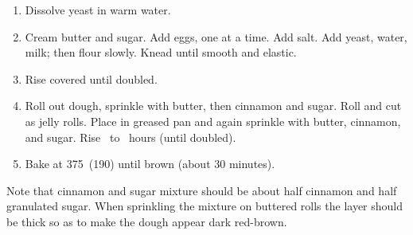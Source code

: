 
\begin{ingredients}
\end{ingredients}


\begin{recipe}
  \begin{enumerate}
  \item Dissolve yeast in warm water.

  \item Cream butter and sugar.  Add eggs, one at a time.  Add salt.
  Add yeast, water, milk; then flour slowly.  Knead until smooth and
  elastic.

\item Rise covered until doubled.

\item Roll out dough, sprinkle with butter, then cinnamon and sugar.
  Roll and cut as jelly rolls. Place in greased pan and again sprinkle
  with butter, cinnamon, and sugar.  Rise \fracH\ to \fracQQ\ hours
  (until doubled).

\item Bake at 375\F\ (190\C) until brown (about 30 minutes).

  \end{enumerate}

  Note that cinnamon and sugar mixture should be about half cinnamon
  and half granulated sugar.  When sprinkling the mixture on buttered
  rolls the layer should be thick so as to make the dough appear dark
  red-brown.
\end{recipe}
